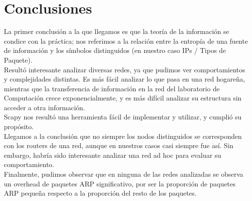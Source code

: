 \section{Conclusiones}

La primer conclusión a la que llegamos es que la teoría de la información se condice con la práctica; nos referimos a la relación entre la entropía de una fuente de información y los símbolos distinguidos (en nuestro caso IPs / Tipos de Paquete).\\

Resultó interesante analizar diversas redes, ya que pudimos ver comportamientos y complejidades distintas. Es más fácil analizar lo que pasa en una red hogareña, mientras que la transferencia de información en la red del laboratorio de Computación crece exponencialmente, y es más difícil analizar su estructura sin acceder a otra información.\\

Scapy nos resultó una herramienta fácil de implementar y utilizar, y cumplió su propósito.\\

Llegamos a la conclusión que no siempre los nodos distinguidos se corresponden con los routers de una red, aunque en nuestros casos casi siempre fue así. Sin embargo, habría sido interesante analizar una red ad hoc para evaluar su comportamiento.\\

Finalmente, pudimos observar que en ninguna de las redes analizadas se observa un overhead de paquetes ARP significativo, por ser la proporción de paquetes ARP pequeña respecto a la proporción del resto de los paquetes.

